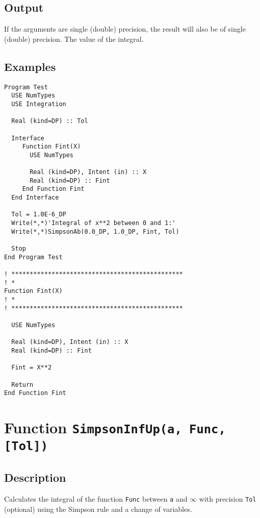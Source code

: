 \subsection{Output}

If the arguments are single (double) precision, the result will also be of
single (double) precision. The value of the integral.



\subsection{Examples}

\begin{verbatim}
Program Test
  USE NumTypes
  USE Integration

  Real (kind=DP) :: Tol

  Interface 
     Function Fint(X)
       USE NumTypes

       Real (kind=DP), Intent (in) :: X
       Real (kind=DP) :: Fint
     End Function Fint
  End Interface

  Tol = 1.0E-6_DP
  Write(*,*)'Integral of x**2 between 0 and 1:'
  Write(*,*)SimpsonAb(0.0_DP, 1.0_DP, Fint, Tol)

  Stop
End Program Test

! ***********************************************
! *
Function Fint(X)
! *  
! ***********************************************

  USE NumTypes

  Real (kind=DP), Intent (in) :: X
  Real (kind=DP) :: Fint

  Fint = X**2

  Return
End Function Fint
\end{verbatim}

\section{Function \texttt{SimpsonInfUp(a, Func, [Tol])}}

\subsection{Description}

Calculates the integral of the function \texttt{Func} between
\texttt{a} and $\infty$ with precision \texttt{Tol} (optional) using
the Simpson rule and a change of variables.


